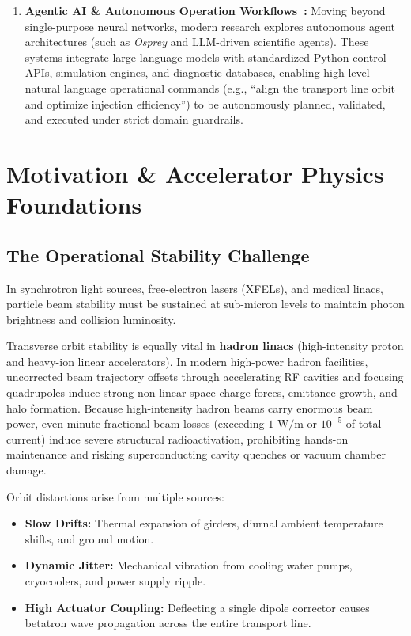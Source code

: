 \documentclass[11pt,a4paper]{article}
\begin{document}
\begin{enumerate}
    \item \textbf{Agentic AI \& Autonomous Operation Workflows~\cite{hellert2024autonomous}:}
    Moving beyond single-purpose neural networks, modern research explores autonomous agent architectures (such as \textit{Osprey} and LLM-driven scientific agents). These systems integrate large language models with standardized Python control APIs, simulation engines, and diagnostic databases, enabling high-level natural language operational commands (e.g., ``align the transport line orbit and optimize injection efficiency'') to be autonomously planned, validated, and executed under strict domain guardrails.
\end{enumerate}


\section{Motivation \& Accelerator Physics Foundations}

\subsection{The Operational Stability Challenge}
In synchrotron light sources, free-electron lasers (XFELs), and medical linacs, particle beam stability must be sustained at sub-micron levels to maintain photon brightness and collision luminosity. 

Transverse orbit stability is equally vital in \textbf{hadron linacs} (high-intensity proton and heavy-ion linear accelerators). In modern high-power hadron facilities, uncorrected beam trajectory offsets through accelerating RF cavities and focusing quadrupoles induce strong non-linear space-charge forces, emittance growth, and halo formation. Because high-intensity hadron beams carry enormous beam power, even minute fractional beam losses (exceeding $1\text{ W/m}$ or $10^{-5}$ of total current) induce severe structural radioactivation, prohibiting hands-on maintenance and risking superconducting cavity quenches or vacuum chamber damage.

Orbit distortions arise from multiple sources:
\begin{itemize}
    \item \textbf{Slow Drifts:} Thermal expansion of girders, diurnal ambient temperature shifts, and ground motion.
    \item \textbf{Dynamic Jitter:} Mechanical vibration from cooling water pumps, cryocoolers, and power supply ripple.
    \item \textbf{High Actuator Coupling:} Deflecting a single dipole corrector causes betatron wave propagation across the entire transport line.
\end{itemize}
\end{document}
